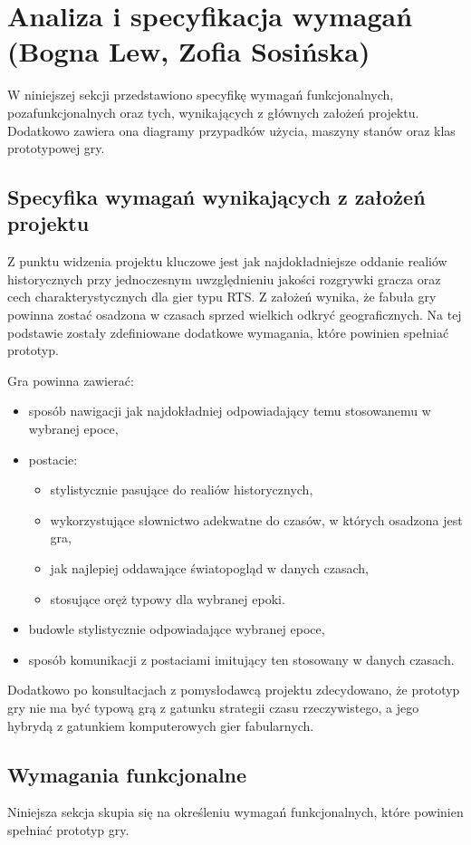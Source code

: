 \section{Analiza i specyfikacja wymagań (Bogna Lew, Zofia Sosińska)}\label{s:wymagania}
W niniejszej sekcji przedstawiono specyfikę wymagań funkcjonalnych, pozafunkcjonalnych oraz tych, wynikających z
głównych założeń projektu. Dodatkowo zawiera ona diagramy przypadków użycia, maszyny stanów oraz klas prototypowej gry.

\subsection{Specyfika wymagań wynikających z założeń projektu}
Z punktu widzenia projektu kluczowe jest jak najdokładniejsze oddanie realiów historycznych przy jednoczesnym
uwzględnieniu jakości rozgrywki gracza oraz cech charakterystycznych dla gier typu RTS. Z założeń wynika, że fabuła
gry powinna zostać osadzona w czasach sprzed wielkich odkryć geograficznych. Na tej podstawie zostały zdefiniowane
dodatkowe wymagania, które powinien spełniać prototyp.

Gra powinna zawierać:
\begin{itemize}
  \item sposób nawigacji jak najdokładniej odpowiadający temu stosowanemu w wybranej epoce,
  \item postacie:
  \begin{itemize}
    \item stylistycznie pasujące do realiów historycznych,
    \item wykorzystujące słownictwo adekwatne do czasów, w których osadzona jest gra,
    \item jak najlepiej oddawające światopogląd w danych czasach,
    \item stosujące oręż typowy dla wybranej epoki.
  \end{itemize}
  \item budowle stylistycznie odpowiadające wybranej epoce,
  \item sposób komunikacji z postaciami imitujący ten stosowany w danych czasach.
\end{itemize}

Dodatkowo po konsultacjach z pomysłodawcą projektu zdecydowano, że prototyp gry nie ma być typową grą z gatunku strategii
czasu rzeczywistego, a jego hybrydą z gatunkiem komputerowych gier fabularnych.

\subsection{Wymagania funkcjonalne}\label{ss:fun}
Niniejsza sekcja skupia się na określeniu wymagań funkcjonalnych, które powinien spełniać prototyp gry.

